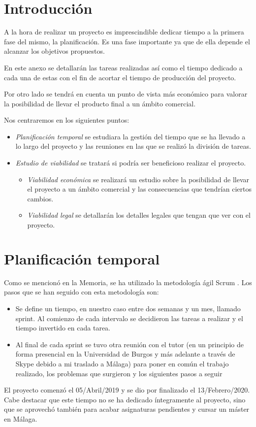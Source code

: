 
\section{Introducción}
A la hora de realizar un proyecto es imprescindible dedicar tiempo a la primera fase del mismo, la planificación. Es una fase importante ya que de ella depende el alcanzar los objetivos propuestos.

En este anexo se detallarán las tareas realizadas así como el tiempo dedicado a cada una de estas con el fin de acortar el tiempo de producción del proyecto.

Por otro lado se tendrá en cuenta un punto de vista más económico para valorar la posibilidad de llevar el producto final a un ámbito comercial.

Nos centraremos en los siguientes puntos:
\begin{itemize}
\item \textit{Planificación temporal} se estudiara la gestión del tiempo que se ha llevado a lo largo del proyecto y las reuniones en las que se realizó la división de tareas.
\item \textit{Estudio de viabilidad} se tratará si podría ser beneficioso realizar el proyecto.
\begin{itemize}
\item \textit{Viabilidad económica} se realizará un estudio sobre la posibilidad de llevar el proyecto a un ámbito comercial y las consecuencias que tendrían ciertos cambios.
\item \textit{Viabilidad legal} se detallarán los detalles legales que tengan que ver con el proyecto.
\end{itemize}
\end{itemize}
\section{Planificación temporal}
Como se mencionó en la Memoria, se ha utilizado la metodología ágil Scrum \cite{wiki:scrum}.
Los pasos que se han seguido con esta metodología son:
\begin{itemize}
\item Se define un tiempo, en nuestro caso entre dos semanas y un mes, llamado sprint. Al comienzo de cada intervalo se decidieron las tareas a realizar y el tiempo invertido en cada tarea.
\item Al final de cada sprint se tuvo otra reunión con el tutor (en un principio de forma presencial en la Universidad de Burgos y más adelante a través de Skype debido a mi traslado a Málaga) para poner en común el trabajo realizado, los problemas que surgieron y los siguientes pasos a seguir
\end{itemize}
El proyecto comenzó el 05/Abril/2019 y se dio por finalizado el 13/Febrero/2020. Cabe destacar que este tiempo no se ha dedicado íntegramente al proyecto, sino que se aprovechó también para acabar asignaturas pendientes y cursar un máster en Málaga.

